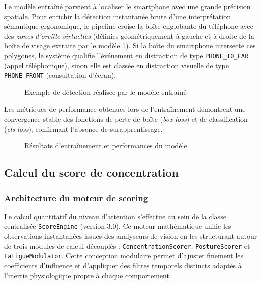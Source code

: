 Le modèle entraîné parvient à localiser le smartphone avec une grande précision spatiale. Pour enrichir la détection instantanée brute d'une interprétation sémantique ergonomique, le pipeline croise la boîte englobante du téléphone avec des \textit{zones d'oreille virtuelles} (définies géométriquement à gauche et à droite de la boîte de visage extraite par le modèle 1). Si la boîte du smartphone intersecte ces polygones, le système qualifie l'événement en distraction de type \texttt{PHONE\_TO\_EAR} (appel téléphonique), sinon elle est classée en distraction visuelle de type \texttt{PHONE\_FRONT} (consultation d'écran).

\begin{figure}[H]
    \centering
    \caption{Exemple de détection réalisée par le modèle entraîné}
    \label{fig:model2_detection}
\end{figure}

Les métriques de performance obtenues lors de l'entraînement démontrent une convergence stable des fonctions de perte de boîte (\textit{box loss}) et de classification (\textit{cls loss}), confirmant l'absence de surapprentissage.

\begin{figure}[H]
    \centering
    \caption{Résultats d'entraînement et performances du modèle}
    \label{fig:model2_metrics}
\end{figure}

\subsection{Calcul du score de concentration}

\subsubsection{Architecture du moteur de scoring}

Le calcul quantitatif du niveau d'attention s'effectue au sein de la classe centralisée \texttt{ScoreEngine} (version 3.0). Ce moteur mathématique unifie les observations instantanées issues des analyseurs de vision en les structurant autour de trois modules de calcul découplés : \texttt{ConcentrationScorer}, \texttt{PostureScorer} et \texttt{FatigueModulator}. Cette conception modulaire permet d'ajuster finement les coefficients d'influence et d'appliquer des filtres temporels distincts adaptés à l'inertie physiologique propre à chaque comportement.


